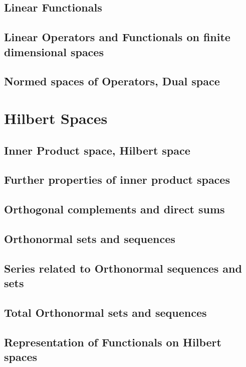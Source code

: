 \subsection{Linear Functionals}
\subsection{Linear Operators and Functionals on finite dimensional spaces}
\subsection{Normed spaces of Operators, Dual space}
\section{Hilbert Spaces}
\subsection{Inner Product space, Hilbert space}
\subsection{Further properties of inner product spaces}
\subsection{Orthogonal complements and direct sums}
\subsection{Orthonormal sets and sequences}
\subsection{Series related to Orthonormal sequences and sets}
\subsection{Total Orthonormal sets and sequences}
\setcounter{subsection}{7}
\subsection{Representation of Functionals on Hilbert spaces}

